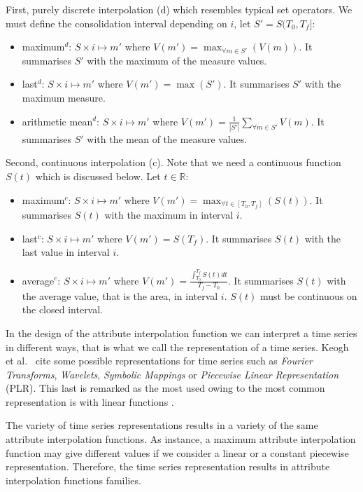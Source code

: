 First, purely discrete interpolation (d) which resembles typical set
operators. We must define the consolidation interval depending on $i$,
let $S'=S(T_0,T_f]$:
\begin{itemize}
\item maximum$^d$: $S \times i \mapsto m'$ where $V(m') = \max_{\forall m
    \in S'}(V(m))$. It summarises $S'$ with the maximum of
  the measure values.
\item last$^d$: $S \times i \mapsto m'$ where $V(m') = \max(S')$. It
  summarises $S'$ with the maximum measure.
\item arithmetic mean$^d$: $S \times i \mapsto m'$ where $V(m') =
  \frac{1}{|S'|} \sum\limits_{\forall m\in S'} V(m)$. It
  summarises $S'$ with the mean of the measure values.
\end{itemize}


Second, continuous interpolation (c). Note that we need a continuous
function $S(t)$ which is discussed below. Let $t\in\mathbb{R}$:
\begin{itemize}
\item maximum$^c$: $S \times i \mapsto m'$ where $V(m') = \max_{\forall t
    \in [T_0,T_f]}(S(t))$. It summarises $S(t)$ with the maximum in
  interval $i$.
\item last$^c$: $S \times i \mapsto m'$ where $V(m') = S(T_f)$. It
  summarises $S(t)$ with the last value in interval $i$.
\item average$^c$: $S \times i \mapsto m'$ where $V(m') =
  \frac{\int_{T_0}^{T_f} S(t)dt}{T_f-T_0}$. It summarises $S(t)$ with
  the average value, that is the area, in interval $i$. $S(t)$ must be
  continuous on the closed interval.
\end{itemize}


In the design of the attribute interpolation function we can interpret
a time series in different ways, that is what we call the
representation of a time series. Keogh et al.\ \cite{last:keogh} cite
some possible representations for time series such as \emph{Fourier
  Transforms}, \emph{Wavelets}, \emph{Symbolic Mappings} or
\emph{Piecewise Linear Representation} (PLR). This last is remarked as
the most used owing to the most common representation is with linear
functions \cite{keogh01}.

The variety of time series representations results in a variety of the
same attribute interpolation functions. As instance, a maximum
attribute interpolation function may give different values if we
consider a linear or a constant piecewise representation. Therefore,
the time series representation results in attribute interpolation
functions families.


